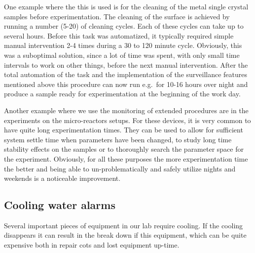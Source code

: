 One example where the this is used is for the cleaning of the metal
single crystal samples before experimentation. The cleaning of the
surface is achieved by running a number (5-20) of cleaning
cycles. Each of these cycles can take up to several hours. Before this
task was automatized, it typically required simple manual intervention
2-4 times during a 30 to 120 minute cycle. Obviously, this was a
suboptimal solution, since a lot of time was spent, with only small
time intervals to work on other things, before the next manual
intervention. After the total automation of the task and the
implementation of the surveillance features mentioned above this
procedure can now run e.g.\ for 10-16 hours over night and produce a
sample ready for experimentation at the beginning of the work day.

Another example where we use the monitoring of extended procedures are
in the experiments on the micro-reactors\cite{Henriksen2009}
setups. For these devices, it is very common to have quite long
experimentation times. They can be used to allow for sufficient system
settle time when parameters have been changed, to study long time
stability effects on the samples or to thoroughly search the parameter
space for the experiment. Obviously, for all these purposes the more
experimentation time the better and being able to un-problematically
and safely utilize nights and weekends is a noticeable
improvement.

\subsection{Cooling water alarms}\label{sec:cooling_water_alarms}

Several important pieces of equipment in our lab require cooling. If
the cooling disappears it can result in the break down if this
equipment, which can be quite expensive both in repair cots and lost
equipment up-time.%

